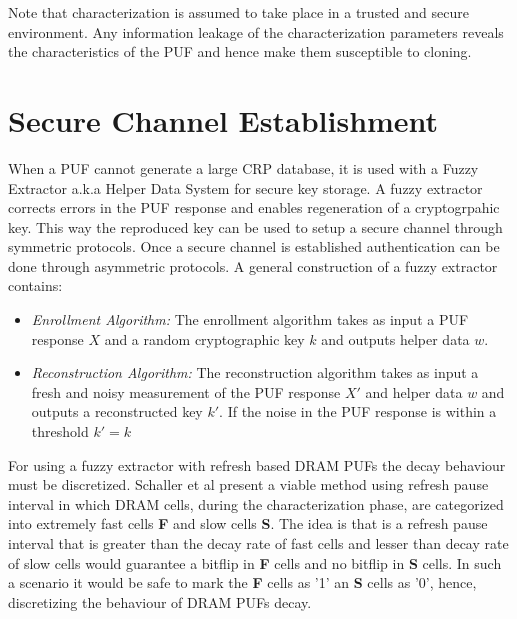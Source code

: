 \documentclass[journal, a4paper]{IEEEtran}
\begin{document}
Note that characterization is assumed to take place in a trusted and secure environment. Any information leakage of the characterization parameters reveals the characteristics of the PUF and hence make them susceptible to cloning.

\section{Secure Channel Establishment}

When a PUF cannot generate a large CRP database, it is used with a Fuzzy Extractor a.k.a Helper Data System \cite{HDS15} for secure key storage. A fuzzy extractor corrects errors in the PUF response \cite{SUT18} and enables regeneration of a cryptogrpahic key. This way the reproduced key can be used to setup a secure channel through symmetric protocols. Once a secure channel is established authentication can be done through asymmetric protocols. A general construction of a fuzzy extractor contains:

\begin{itemize}
    \item \textit{Enrollment Algorithm:} The enrollment algorithm takes as input a PUF response \(X\) and a random cryptographic key \(k\) and outputs helper data \(w\).
    \item \textit{Reconstruction Algorithm:}  The reconstruction algorithm takes as input a fresh and noisy measurement of the PUF response \(X'\) and helper data \(w\) and outputs a reconstructed key \(k'\). If the noise in the PUF response is within a threshold \( k' = k\)
\end{itemize}

For using a fuzzy extractor with refresh based DRAM PUFs the decay behaviour must be discretized. Schaller et al present a viable method using refresh pause interval in which DRAM cells, during the characterization phase, are categorized into extremely fast cells \textbf{F} and slow cells \textbf{S}. The idea is that is a refresh pause interval that is greater than the decay rate of fast cells and lesser than decay rate of slow cells would guarantee a bitflip in \textbf{F} cells and no bitflip in \textbf{S} cells. In such a scenario it would be safe to mark the \textbf{F} cells as '1' an \textbf{S} cells as '0', hence, discretizing the behaviour of DRAM PUFs decay.
\end{document}
